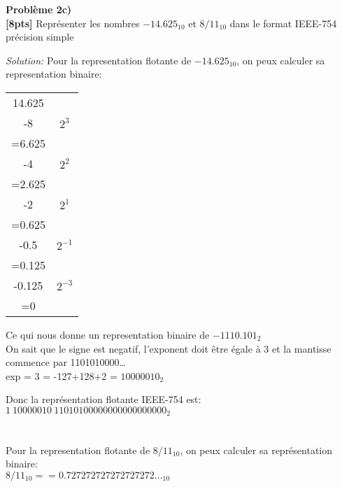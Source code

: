 \documentclass{article}
\newenvironment{problem}[2][Problème]
    { \begin{mdframed}[backgroundcolor=gray!20] \textbf{#1 #2} \\}
    {  \end{mdframed}}
\newenvironment{solution}
    {\textit{Solution:}}
    {}
\begin{document}
\begin{problem}{2c)}
\textbf{[8pts]} Représenter les nombres $-14.625_{10}$ et $8/11_{10}$ dans le format IEEE-754 précision simple
\end{problem}

\begin{solution}
    Pour la representation flotante de $-14.625_{10}$, on peux calculer sa representation binaire:\\
    \begin{tabular}{|c|c|}
        \hline
        14.625 \\
        -8 & $2^3$\\
        \hline
        =6.625 \\
        -4 & $2^2$\\ 
        \hline
        =2.625 \\ 
        -2 & $2^1$\\
        \hline
        =0.625\\ 
        -0.5 & $2^{-1}$\\ 
        \hline
        =0.125\\ 
        -0.125 & $2^{-3}$\\ 
        \hline
        =0\\ 
        \hline
    \end{tabular}
    Ce qui nous donne un representation binaire de $-1110.101_2$\\

    On sait que le signe est negatif, l'exponent doit être égale à 3 et la mantisse commence par 1101010000\dots\\

    exp = 3 = -127+128+2 = $10000010_2$

    Donc la représentation flotante IEEE-754 est: \\
    $1\ 10000010\ 11010100000000000000000_2$ \\\\\\

    Pour la representation flotante de $8/11_{10}$, on peux calculer sa représentation binaire:\\
    $8/11_{10} == 0.727272727272727272\dots_{10}$


\end{solution}
\end{document}
